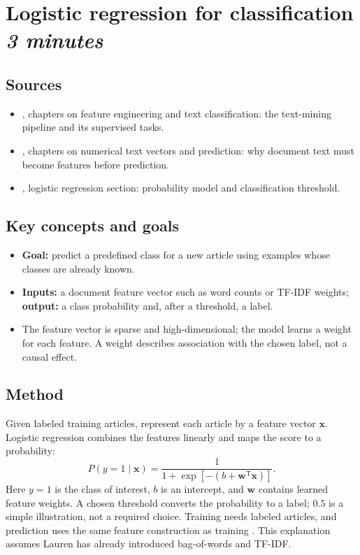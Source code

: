 \documentclass[11pt]{article}
\begin{document}
\section[Logistic regression for classification]{Logistic regression for classification \hfill\normalsize\textit{3 minutes}}

\subsection*{Sources}
\begin{itemize}
  \item \textcite{qamar2024}, chapters on feature engineering and text classification: the text-mining pipeline and its supervised tasks.
  \item \textcite{weiss2005}, chapters on numerical text vectors and prediction: why document text must become features before prediction.
  \item \textcite{sklearnlogistic}, logistic regression section: probability model and classification threshold.
\end{itemize}

\subsection*{Key concepts and goals}
\begin{itemize}
  \item \textbf{Goal:} predict a predefined class for a new article using examples whose classes are already known.
  \item \textbf{Inputs:} a document feature vector such as word counts or TF-IDF weights; \textbf{output:} a class probability and, after a threshold, a label.
  \item The feature vector is sparse and high-dimensional; the model learns a weight for each feature. A weight describes association with the chosen label, not a causal effect.
\end{itemize}

\subsection*{Method}
Given labeled training articles, represent each article by a feature vector $\mathbf{x}$. Logistic regression combines the features linearly and maps the score to a probability:
\[
P(y=1\mid\mathbf{x})=\frac{1}{1+\exp[-(b+\mathbf{w}^{\mathsf T}\mathbf{x})]}.
\]
Here $y=1$ is the class of interest, $b$ is an intercept, and $\mathbf{w}$ contains learned feature weights. A chosen threshold converts the probability to a label; $0.5$ is a simple illustration, not a required choice. Training needs labeled articles, and prediction uses the same feature construction as training \parencite{sklearnlogistic,qamar2024}. This explanation assumes Lauren has already introduced bag-of-words and TF-IDF.
\end{document}
